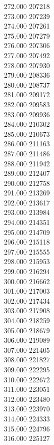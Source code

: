 { 272.000	207218 \\
 273.000	207239 \\
 274.000	207261 \\
 275.000	207279 \\
 276.000	207306 \\
 277.000	207492 \\
 278.000	207930 \\
 279.000	208336 \\
 280.000	208737 \\
 281.000	209172 \\
 282.000	209583 \\
 283.000	209936 \\
 284.000	210302 \\
 285.000	210673 \\
 286.000	211163 \\
 287.000	211486 \\
 288.000	211942 \\
 289.000	212407 \\
 290.000	212758 \\
 291.000	213269 \\
 292.000	213617 \\
 293.000	213984 \\
 294.000	214351 \\
 295.000	214709 \\
 296.000	215118 \\
 297.000	215555 \\
 298.000	215953 \\
 299.000	216294 \\
 300.000	216662 \\
 301.000	217003 \\
 302.000	217434 \\
 303.000	217908 \\
 304.000	218259 \\
 305.000	218679 \\
 306.000	219089 \\
 307.000	221405 \\
 308.000	221827 \\
 309.000	222295 \\
 310.000	222672 \\
 311.000	223051 \\
 312.000	223480 \\
 313.000	223970 \\
 314.000	224333 \\
 315.000	224796 \\
 316.000	225127 \\
}
